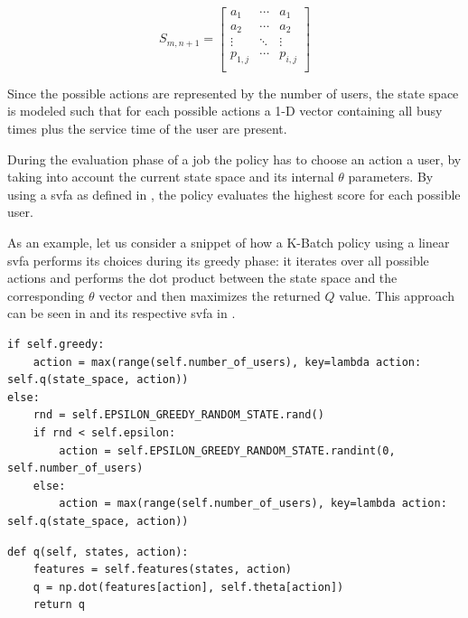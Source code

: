 \begin{equation}
\label{eq:kbatch_sp}
	S_{m,n+1} = 
	\begin{bmatrix}
	a_1 & \cdots & a_1 \\
	a_2 & \cdots & a_2 \\
	\vdots & \ddots & \vdots \\
	p_{1,j} & \cdots & p_{i,j} \\
	\end{bmatrix}
\end{equation}

Since the possible actions are represented by the number of users, the state space is modeled such that for each possible actions a 1-D vector containing all busy times plus the service time of the user are present.

During the evaluation phase of a job the policy has to choose an action \ie a user, by taking into account the current state space and its internal $\theta$ parameters. By using a \gls{svfa} as defined in , the policy evaluates the highest score for each possible user.

As an example, let us consider a snippet of how a K-Batch policy using a linear \gls{svfa} performs its choices during its greedy phase: it iterates over all possible actions and performs the dot product between the state space and the corresponding $\theta$ vector and then maximizes the returned $Q$ value. This approach can be seen in  and its respective \gls{svfa} in .

\begin{lstlisting}[caption={\glsentrylong{ep} approach where if the policy is defined as greedy, actions are chosen by maximing the $Q$ values otherwise, with probability $\epsilon$ actions are randomly sampled.},label=lst:e_greedy,style=CustomPython]
if self.greedy:
    action = max(range(self.number_of_users), key=lambda action: self.q(state_space, action))
else:
    rnd = self.EPSILON_GREEDY_RANDOM_STATE.rand()
    if rnd < self.epsilon:
        action = self.EPSILON_GREEDY_RANDOM_STATE.randint(0, self.number_of_users)
    else:
        action = max(range(self.number_of_users), key=lambda action: self.q(state_space, action))
\end{lstlisting}

\begin{lstlisting}[caption=\glsentryshort{svfa} which performs the dot product between features $\phi$ and weight parameters $\theta$.,label=lst:value_f_approx,style=CustomPython]
def q(self, states, action):
    features = self.features(states, action)
    q = np.dot(features[action], self.theta[action])
    return q
\end{lstlisting}
 
